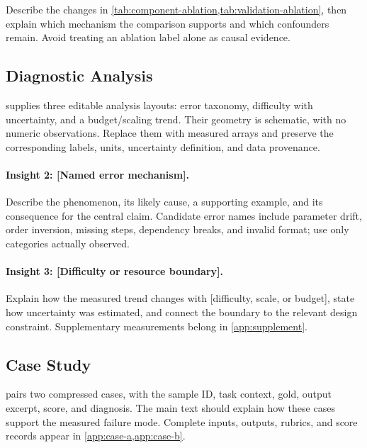 Describe the changes in \cref{tab:component-ablation,tab:validation-ablation}, then explain which mechanism the comparison supports and which confounders remain. Avoid treating an ablation label alone as causal evidence.

\subsection{Diagnostic Analysis}
 supplies three editable analysis layouts: error taxonomy, difficulty with uncertainty, and a budget/scaling trend. Their geometry is schematic, with no numeric observations. Replace them with measured arrays and preserve the corresponding labels, units, uncertainty definition, and data provenance.

\begin{widefigure}[htbp]
\centering

\caption{\textbf{Three analysis scaffolds.} Bars, intervals, and the dashed series are layout placeholders; no empirical trend is asserted. Replace each panel with verified data and a specific diagnostic question.}
\label{fig:analysis}
\end{widefigure}

\paragraph{Insight 2: [Named error mechanism].}
Describe the phenomenon, its likely cause, a supporting example, and its consequence for the central claim. Candidate error names include parameter drift, order inversion, missing steps, dependency breaks, and invalid format; use only categories actually observed.

\paragraph{Insight 3: [Difficulty or resource boundary].}
Explain how the measured trend changes with [difficulty, scale, or budget], state how uncertainty was estimated, and connect the boundary to the relevant design constraint. Supplementary measurements belong in \cref{app:supplement}.

\subsection{Case Study}
 pairs two compressed cases, with the sample ID, task context, gold, output excerpt, score, and diagnosis. The main text should explain how these cases support the measured failure mode. Complete inputs, outputs, rubrics, and score records appear in \cref{app:case-a,app:case-b}.

\begin{widefigure}[htbp]
\centering

\caption{\textbf{Compressed case-study scaffold.} Use one verified success and one verified failure to expose the capability distinction. All fields are placeholders; the complete records belong in the appendix.}
\label{fig:cases}
\end{widefigure}
